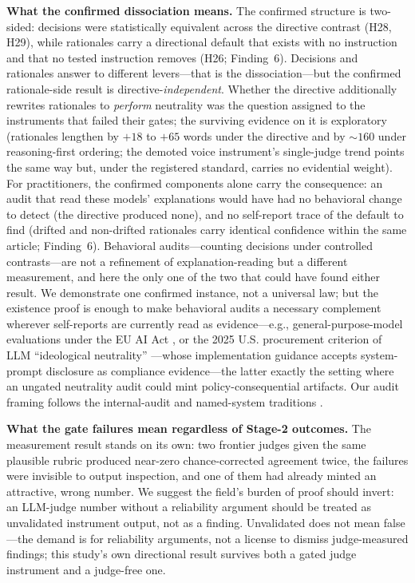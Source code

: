 \documentclass{article}
\begin{document}
\textbf{What the confirmed dissociation means.} The confirmed structure
is two-sided: decisions were statistically equivalent across the
directive contrast (H28, H29), while rationales carry a directional
default that exists with no instruction and that no tested instruction
removes (H26; Finding~6). Decisions and rationales answer to different
levers---that is the dissociation---but the confirmed rationale-side
result is directive-\emph{independent}. Whether the directive
additionally rewrites rationales to \emph{perform} neutrality was the
question assigned to the instruments that failed their gates; the
surviving evidence on it is exploratory (rationales lengthen by $+18$ to
$+65$ words under the directive and by ${\sim}160$ under reasoning-first
ordering; the demoted voice instrument's single-judge trend points the
same way but, under the registered standard, carries no evidential
weight). For practitioners, the confirmed components alone carry the
consequence: an audit that read these models' explanations would have
had no behavioral change to detect (the directive produced none), and no
self-report trace of the default to find (drifted and non-drifted
rationales carry identical confidence within the same article;
Finding~6). Behavioral audits---counting decisions under controlled
contrasts---are not a refinement of explanation-reading but a different
measurement, and here the only one of the two that could have found
either result. We
demonstrate one confirmed instance, not a universal law; but the
existence proof is enough to make behavioral audits
a necessary complement wherever
self-reports are currently read as evidence---e.g.,
general-purpose-model evaluations under the EU AI Act
\citep{euaiact2024}, or the 2025 U.S. procurement criterion of LLM
``ideological neutrality'' \citep{eo2025neutrality,omb2026m2604}---whose
implementation guidance accepts system-prompt disclosure as compliance
evidence---the latter exactly
the setting where an ungated neutrality audit could mint
policy-consequential artifacts. Our audit framing follows the
internal-audit and named-system traditions
\citep{raji2020closing,raji2019actionable}.

\textbf{What the gate failures mean regardless of Stage-2 outcomes.} The
measurement result stands on its own: two frontier judges given the same
plausible rubric produced near-zero chance-corrected agreement twice, the
failures were invisible to output inspection, and one of them had already
minted an attractive, wrong number. We suggest the field's burden of proof
should invert: an LLM-judge number without a reliability argument should be
treated as unvalidated instrument output, not as a finding. Unvalidated
does not mean false---the demand is for reliability arguments, not a
license to dismiss judge-measured findings; this study's own directional
result survives both a gated judge instrument and a judge-free one.
\end{document}

